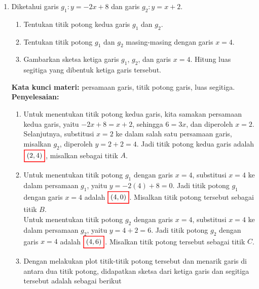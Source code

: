 \documentclass[10pt,openany,a4paper]{article}
\theoremstyle{definition}
\theoremstyle{definition}
\theoremstyle{plain}
\newenvironment{jawab}[2][tes]{%
\par\noindent\textbf{Kata kunci materi:} #1.\\
\textbf{Penyelesaian:} #2%
}{}
\begin{document}
\begin{enumerate}
    \item Diketahui garis $g_1: y=-2x+8$ dan garis $g_2: y=x+2$.
    \begin{enumerate}
        \item Tentukan titik potong kedua garis $g_1$ dan $g_2$.
        \item Tentukan titik potong $g_1$ dan $g_2$ masing-masing dengan garis $x=4$.
        \item Gambarkan sketsa ketiga garis $g_1$, $g_2$, dan garis $x=4$. Hitung luas segitiga yang dibentuk ketiga garis tersebut.
    \end{enumerate}
    \begin{jawab}[persamaan garis, titik potong garis, luas segitiga]{
        \begin{enumerate}
            \item Untuk menentukan titik potong kedua garis, kita samakan persamaan kedua garis, yaitu $-2x+8=x+2$, sehingga $6=3x$, dan diperoleh $x=2$. Selanjutnya, substitusi \(x = 2\) ke dalam salah satu persamaan garis, misalkan \(g_2\), diperoleh $y=2+2=4$. Jadi titik potong kedua garis adalah \(\colorlet{oldcolor}{.}
        \color{red}
        \setlength{\fboxrule}{1pt} \boxed{\color{oldcolor}(2,4)}\color{oldcolor}\), misalkan sebagai titik $A$.
            \item Untuk menentukan titik potong \(g_1\) dengan garis \(x = 4\), substitusi \(x = 4\) ke dalam persamaan \(g_1\), yaitu $y = -2(4) + 8 = 0$. Jadi titik potong \(g_1\) dengan garis \(x = 4\) adalah \(\colorlet{oldcolor}{.}
        \color{red}
        \setlength{\fboxrule}{1pt} \boxed{\color{oldcolor}(4,0)}\color{oldcolor}\). Misalkan titik potong tersebut sebagai titik $B$.\\
            Untuk menentukan titik potong \(g_2\) dengan garis \(x = 4\), substitusi \(x = 4\) ke dalam persamaan \(g_2\), yaitu $y = 4 + 2 = 6$. Jadi titik potong \(g_2\) dengan garis \(x = 4\) adalah \(\colorlet{oldcolor}{.}
        \color{red}
        \setlength{\fboxrule}{1pt} \boxed{\color{oldcolor}(4,6)}\color{oldcolor}\). Misalkan titik potong tersebut sebagai titik $C$.
            \item Dengan melakukan plot titik-titik potong tersebut dan menarik garis di antara dua titik potong, didapatkan sketsa dari ketiga garis dan segitiga tersebut adalah sebagai berikut

\end{enumerate}}
\end{jawab}
\end{enumerate}
\end{document}
